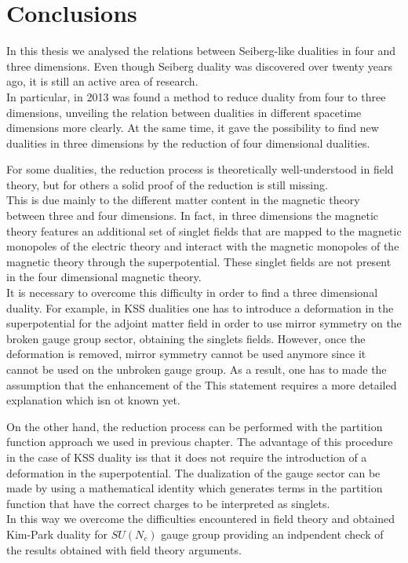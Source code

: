 \chapter*{\bfseries Conclusions}

In this thesis we analysed the relations between Seiberg-like dualities in four and three dimensions. 
Even though Seiberg duality was discovered over twenty years ago, it is still an active area of research.\\
In particular, in 2013 was found a method to reduce duality from four to three dimensions, unveiling the relation between dualities in different spacetime dimensions more clearly.
At the same time, it gave the possibility to find new dualities in three dimensions by the reduction of four dimensional dualities.

For some dualities, the reduction process is theoretically well-understood in field theory, but for others a solid proof of the reduction is still missing.\\
This is due mainly to the different matter content in the magnetic theory between three and four dimensions.
In fact, in three dimensions the magnetic theory features an additional set of singlet fields that are mapped to the magnetic monopoles of the electric theory and interact with the magnetic monopoles of the magnetic theory through the superpotential.
These singlet fields are not present in the four dimensional magnetic theory.
\\
It is necessary to overcome this difficulty in order to find a three dimensional duality.
For example, in KSS dualities one has to introduce a deformation in the superpotential for the adjoint matter field in order to use mirror symmetry on the broken gauge group sector, obtaining the singlets fields. 
However, once the deformation is removed, mirror symmetry cannot be used anymore since it cannot be used on the unbroken gauge group.
As a result, one has to made the assumption that the enhancement of the 
This statement requires a more detailed explanation which isn
ot known yet.

On the other hand, the reduction process can be performed with the partition function approach we used in previous chapter. 
The advantage of this procedure in the case of KSS duality iss that it does not require the introduction of a deformation in the superpotential.
The dualization of the gauge sector can be made by using a mathematical identity which generates terms in the partition function that have the correct charges to be interpreted as singlets.\\
In this way we overcome the difficulties encountered in field theory and obtained Kim-Park duality for $SU(N_c)$ gauge group providing an indpendent check of the results obtained with field theory arguments.


